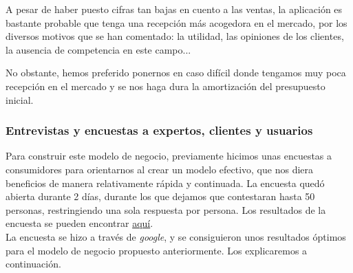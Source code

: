 \documentclass[12pt,a4paper]{article}
\begin{document}
A pesar de haber puesto cifras tan bajas en cuento a las ventas, la aplicación es bastante probable que tenga una recepción más acogedora en el mercado, por los diversos motivos que se han comentado: la utilidad, las opiniones de los clientes, la ausencia de competencia en este campo...

No obstante, hemos preferido ponernos en caso difícil donde tengamos muy poca recepción en el mercado y se nos haga dura la amortización del presupuesto inicial.

\subsubsection{Entrevistas y encuestas a expertos, clientes y usuarios}

Para construir este modelo de negocio, previamente hicimos unas encuestas a consumidores para orientarnos al crear un modelo efectivo, que nos diera beneficios de manera relativamente rápida y continuada. La encuesta quedó abierta durante 2 días, durante los que dejamos que contestaran hasta 50 personas, restringiendo una sola respuesta por persona. Los resultados de la encuesta se pueden encontrar \href{https://docs.google.com/spreadsheets/d/1GI4ZbPoOabUO-Iz5bW1rDRS__W7YZUm5-sTUkwxSdRQ/edit?usp=sharing}{aquí}.\\

La encuesta se hizo a través de \textit{google}, y se consiguieron unos resultados óptimos para el modelo de negocio propuesto anteriormente. Los explicaremos a continuación.
\end{document}
